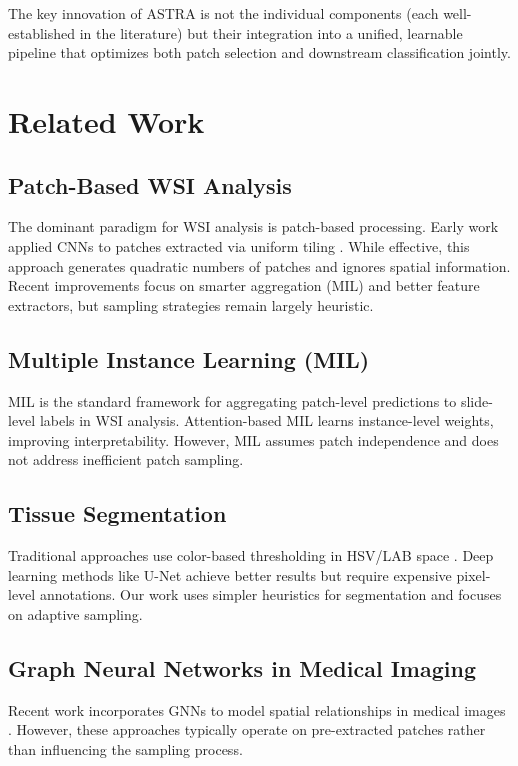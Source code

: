\documentclass[runningheads]{llncs}
\begin{document}
The key innovation of ASTRA is not the individual components (each well-established in the literature) but their integration into a unified, learnable pipeline that optimizes both patch selection and downstream classification jointly.

\section{Related Work}

\label{sec:related}

\subsection{Patch-Based WSI Analysis}

The dominant paradigm for WSI analysis is patch-based processing. Early work applied CNNs to patches extracted via uniform tiling \cite{ref1}. While effective, this approach generates quadratic numbers of patches and ignores spatial information. Recent improvements focus on smarter aggregation (MIL) and better feature extractors, but sampling strategies remain largely heuristic.

\subsection{Multiple Instance Learning (MIL)}

MIL is the standard framework for aggregating patch-level predictions to slide-level labels in WSI analysis. Attention-based MIL \cite{ref2} learns instance-level weights, improving interpretability. However, MIL assumes patch independence and does not address inefficient patch sampling.

\subsection{Tissue Segmentation}

Traditional approaches use color-based thresholding in HSV/LAB space \cite{ref3}. Deep learning methods like U-Net achieve better results but require expensive pixel-level annotations. Our work uses simpler heuristics for segmentation and focuses on adaptive sampling.

\subsection{Graph Neural Networks in Medical Imaging}

Recent work incorporates GNNs to model spatial relationships in medical images \cite{ref4}. However, these approaches typically operate on pre-extracted patches rather than influencing the sampling process.
\end{document}
